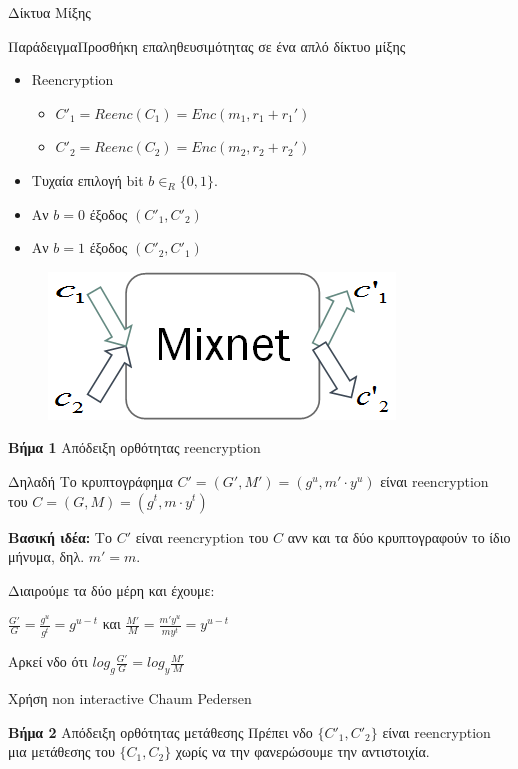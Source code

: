 \documentclass[handout]{beamer}
\begin{document}
\begin{section}{Δίκτυα Μίξης}
\begin{frame}[allowframebreaks]{Παράδειγμα}{Προσθήκη επαληθευσιμότητας σε ένα απλό δίκτυο μίξης}
\begin{multicols}{2}
\begin{itemize}
        \item Reencryption
          \begin{itemize}
        \item ${C'}_1 = Reenc(C_1)=Enc(m_1,r_1+r_1')$ \item ${C'}_2 = Reenc(C_2)=Enc(m_2,r_2+r_2')$
           \end{itemize}
        \item Tυχαία επιλογή bit $b \in_R \{0,1\}$.
        \item Αν $b=0$ έξοδος $({C'}_1, {C'}_2)$ 
        \item Αν $b=1$ έξοδος $({C'}_2, {C'}_1)$
    \end{itemize}
    \vfill \columnbreak
    \begin{figure}
        \includegraphics[scale=0.5]{mix2x2.PNG}
    \end{figure}
\end{multicols}

\framebreak
 
\textbf{Βήμα 1} Απόδειξη ορθότητας reencryption 

\begin{block}{Δηλαδή}
Το κρυπτογράφημα ${C'} = (G',M') = (g^u,m' \cdot y^u)$ είναι reencryption του $C = (G,M) = (g^t,m \cdot y^t)$
\end{block}

\textbf{Βασική ιδέα:} Το ${C'}$ είναι reencryption του $C$ ανν και τα δύο κρυπτογραφούν το ίδιο μήνυμα, δηλ. $m'=m$.

Διαιρούμε τα δύο μέρη και έχουμε:
\begin{center}
$\frac{G'}{G}=\frac{g^u}{g^t}=g^{u-t}$ και 
$\frac{M'}{M}=\frac{m' y^u}{m y^t}=y^{u-t}$ 
\end{center}

Αρκεί νδο ότι $ log_g \frac{G'}{G} = log_y \frac{M'}{M}$

Χρήση non interactive Chaum Pedersen

\framebreak

\begin{block}{\textbf{Βήμα 2} Απόδειξη ορθότητας μετάθεσης }
Πρέπει νδο $\{C'_1,C'_2\}$ είναι reencryption μια μετάθεσης του $\{C_1,C_2\}$ χωρίς να την φανερώσουμε την αντιστοιχία. \\
\end{block}
 


\end{frame}
\end{section}
\end{document}
